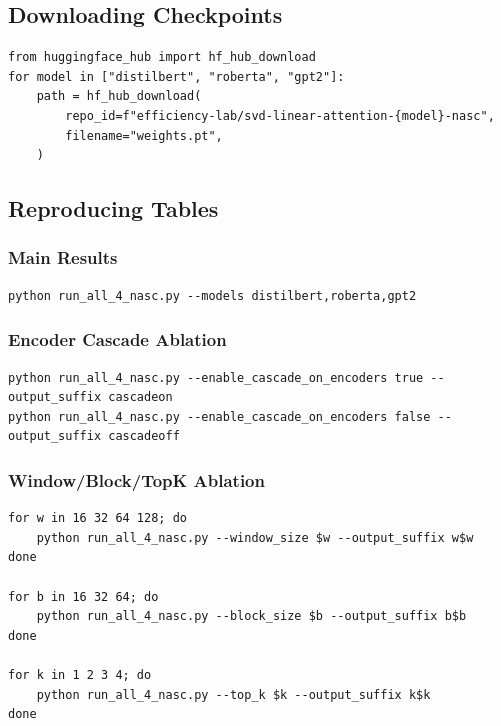 \subsection{Downloading Checkpoints}

\begin{lstlisting}
from huggingface_hub import hf_hub_download
for model in ["distilbert", "roberta", "gpt2"]:
    path = hf_hub_download(
        repo_id=f"efficiency-lab/svd-linear-attention-{model}-nasc",
        filename="weights.pt",
    )
\end{lstlisting}

\subsection{Reproducing Tables}

\subsubsection{Main Results}

\begin{lstlisting}
python run_all_4_nasc.py --models distilbert,roberta,gpt2
\end{lstlisting}

\subsubsection{Encoder Cascade Ablation}

\begin{lstlisting}
python run_all_4_nasc.py --enable_cascade_on_encoders true --output_suffix cascadeon
python run_all_4_nasc.py --enable_cascade_on_encoders false --output_suffix cascadeoff
\end{lstlisting}

\subsubsection{Window/Block/TopK Ablation}

\begin{lstlisting}
for w in 16 32 64 128; do
    python run_all_4_nasc.py --window_size $w --output_suffix w$w
done

for b in 16 32 64; do
    python run_all_4_nasc.py --block_size $b --output_suffix b$b
done

for k in 1 2 3 4; do
    python run_all_4_nasc.py --top_k $k --output_suffix k$k
done
\end{lstlisting}

